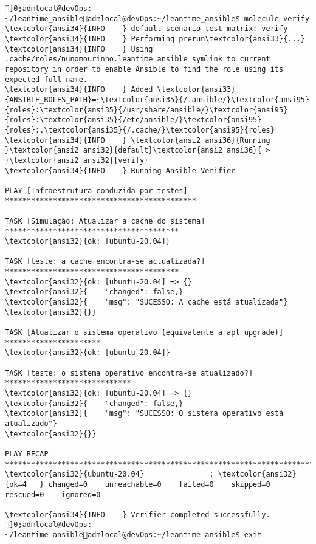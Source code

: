 \documentclass{scrartcl}
\begin{document}
\begin{Verbatim}
]0;admlocal@devOps: ~/leantime_ansibleadmlocal@devOps:~/leantime_ansible$ molecule verify
\textcolor{ansi34}{INFO    } default scenario test matrix: verify
\textcolor{ansi34}{INFO    } Performing prerun\textcolor{ansi33}{...}
\textcolor{ansi34}{INFO    } Using .cache/roles/nunomourinho.leantime_ansible symlink to current repository in order to enable Ansible to find the role using its expected full name.
\textcolor{ansi34}{INFO    } Added \textcolor{ansi33}{ANSIBLE_ROLES_PATH}=~\textcolor{ansi35}{/.ansible/}\textcolor{ansi95}{roles}:\textcolor{ansi35}{/usr/share/ansible/}\textcolor{ansi95}{roles}:\textcolor{ansi35}{/etc/ansible/}\textcolor{ansi95}{roles}:.\textcolor{ansi35}{/.cache/}\textcolor{ansi95}{roles}
\textcolor{ansi34}{INFO    } \textcolor{ansi2 ansi36}{Running }\textcolor{ansi2 ansi32}{default}\textcolor{ansi2 ansi36}{ > }\textcolor{ansi2 ansi32}{verify}
\textcolor{ansi34}{INFO    } Running Ansible Verifier

PLAY [Infraestrutura conduzida por testes] ********************************************

TASK [Simulação: Atualizar a cache do sistema] ****************************************
\textcolor{ansi32}{ok: [ubuntu-20.04]}

TASK [teste: a cache encontra-se actualizada?] ****************************************
\textcolor{ansi32}{ok: [ubuntu-20.04] => {}
\textcolor{ansi32}{    "changed": false,}
\textcolor{ansi32}{    "msg": "SUCESSO: A cache está atualizada"}
\textcolor{ansi32}{}}

TASK [Atualizar o sistema operativo (equivalente a apt upgrade)] **********************
\textcolor{ansi32}{ok: [ubuntu-20.04]}

TASK [teste: o sistema operativo encontra-se atualizado?] *****************************
\textcolor{ansi32}{ok: [ubuntu-20.04] => {}
\textcolor{ansi32}{    "changed": false,}
\textcolor{ansi32}{    "msg": "SUCESSO: O sistema operativo está atualizado"}
\textcolor{ansi32}{}}

PLAY RECAP ****************************************************************************
\textcolor{ansi32}{ubuntu-20.04}               : \textcolor{ansi32}{ok=4   } changed=0    unreachable=0    failed=0    skipped=0    rescued=0    ignored=0

\textcolor{ansi34}{INFO    } Verifier completed successfully.
]0;admlocal@devOps: ~/leantime_ansibleadmlocal@devOps:~/leantime_ansible$ exit

\end{Verbatim}
\end{document}
